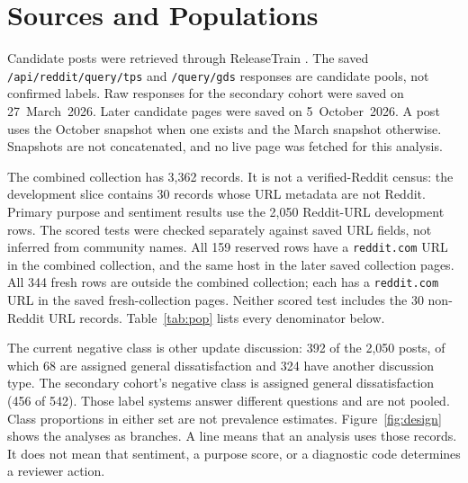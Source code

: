 \documentclass[conference,letterpaper]{IEEEtran}
\begin{document}
\section{Sources and Populations}
Candidate posts were retrieved through \mbox{ReleaseTrain} \cite{ReleaseTrainDocs}. The saved \texttt{/api/reddit/query/tps} and \texttt{/query/gds} responses are candidate pools, not confirmed labels. Raw responses for the secondary cohort were saved on 27~March~2026. Later candidate pages were saved on 5~October~2026. A post uses the October snapshot when one exists and the March snapshot otherwise. Snapshots are not concatenated, and no live page was fetched for this analysis.

The combined collection has 3,362 records. It is not a verified-Reddit census: the development slice contains 30 records whose URL metadata are not Reddit. Primary purpose and sentiment results use the 2,050 Reddit-URL development rows. The scored tests were checked separately against saved URL fields, not inferred from community names. All 159 reserved rows have a \texttt{reddit.com} URL in the combined collection, and the same host in the later saved collection pages. All 344 fresh rows are outside the combined collection; each has a \texttt{reddit.com} URL in the saved fresh-collection pages. Neither scored test includes the 30 non-Reddit URL records. Table~\ref{tab:pop} lists every denominator below.

The current negative class is other update discussion: 392 of the 2,050 posts, of which 68 are assigned general dissatisfaction and 324 have another discussion type. The secondary cohort's negative class is assigned general dissatisfaction (456 of 542). Those label systems answer different questions and are not pooled. Class proportions in either set are not prevalence estimates. Figure~\ref{fig:design} shows the analyses as branches. A line means that an analysis uses those records. It does not mean that sentiment, a purpose score, or a diagnostic code determines a reviewer action.
\end{document}

